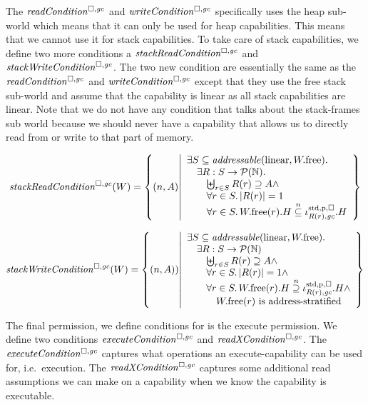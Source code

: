 \begin{jversion}
The $\readCond{}$ and $\writeCond{}$ specifically uses the heap sub-world which means that it can only be used for heap capabilities.
This means that we cannot use it for stack capabilities.
To take care of stack capabilities, we define two more conditions a $\stackReadCond{}$ and $\stackWriteCond{}$.
The two new condition are essentially the same as the $\readCond{}$ and $\writeCond{}$ except that they use the free stack sub-world and assume that the capability is linear as all stack capabilities are linear.
Note that we do not have any condition that talks about the stack-frames sub world because we should never have a capability that allows us to directly read from or write to that part of memory.
\begin{definition}
\[
  \stackReadCond{W} = \left\{ \npair{A} \middle| 
    \begin{array}{l}
      \exists S \subseteq \addressable{\linear, \pwfree} \ldotp \\
      \quad \exists R : S \fun \powerset{\nats} \ldotp\\
      \qquad \biguplus_{r\in S} R(r) \supseteq A \wedge \\
      \qquad \forall r \in S \ldotp |R(r)| = 1\\
      \qquad \forall r \in S \ldotp \pwfree(r).H \nsubeq \stdreg{R(r),\gc}{\pur}.H
    \end{array}
  \right\}
\]
\end{definition}
\begin{definition}
\[
  \stackWriteCond{W} = \left\{ \npair{A}) \middle| 
    \begin{array}{l}
      \exists S \subseteq \addressable{\linear, \pwfree} \ldotp \\
      \quad \exists R : S \fun \powerset{\nats} \\
      \qquad \biguplus_{r\in S} R(r) \supseteq A \wedge \\
      \qquad \forall r \in S \ldotp |R(r)| = 1 \wedge \\
      \qquad \forall r \in S \ldotp \pwfree(r).H \nsupeq \stdreg{R(r),\gc}{\pur}.H \wedge\\
      \qquad \quad \pwfree(r) \text{ is address-stratified}
    \end{array}
  \right\}
\]
\end{definition}
The final permission, we define conditions for is the execute permission.
We define two conditions $\execCond{}$ and $\xReadCond{}$.
The $\execCond{}$ captures what operations an execute-capability can be used for, i.e.\ execution.
The $\xReadCond{}$ captures some additional read assumptions we can make on a capability when we know the capability is executable.


\end{jversion}
